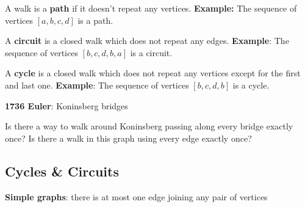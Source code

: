 \documentclass[9pt, letterpaper, oneside]{article}
\begin{document}
A walk is a \textbf{path} if it doesn't repeat any vertices. 
\textbf{Example:} The sequence of vertices $[a,b,c,d]$ is a path.

A \textbf{circuit} is a closed walk which does not repeat any edges.
\textbf{Example}: The sequence of vertices $[b, c, d, b, a]$ is a circuit.

A \textbf{cycle} is a closed walk which does not repeat any vertices except for the first and last one.
\textbf{Example}: The sequence of vertices $[b, c, d, b]$ is a cycle.


\textbf{1736 Euler}: Koninsberg bridges

Is there a way to walk around Koninsberg passing along every bridge exactly once? Is there a walk in this graph using every edge exactly once?

\subsection{Cycles \& Circuits}

\textbf{Simple graphs}: there is at most one edge joining any pair of vertices
\end{document}
